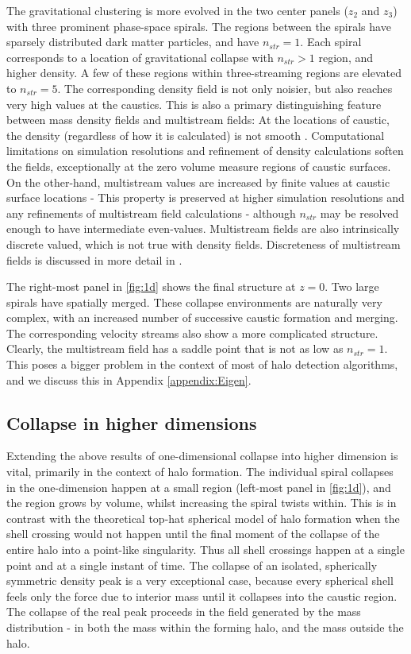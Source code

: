 The gravitational clustering is more evolved in the two center panels ($z_2$ and $z_3$) with three prominent phase-space spirals. The regions between the spirals have sparsely distributed dark matter particles, and have $n_{str} = 1$. Each spiral corresponds to a location of gravitational collapse with $n_{str} > 1$ region, and higher density. A few of these regions within three-streaming regions are elevated to $n_{str} = 5$. The corresponding density field is not only noisier, but also reaches very high values at the caustics. This is also a primary distinguishing feature between mass density fields and multistream fields: At the locations of caustic, the density (regardless of how it is calculated) is not smooth \cite{Vogelsberger2011}. Computational limitations on simulation resolutions and refinement of density calculations soften the fields, exceptionally at the zero volume measure regions of caustic surfaces.  On the other-hand, multistream values are increased by finite values at caustic surface locations - This property is preserved at higher simulation resolutions and any refinements of multistream field calculations - although $n_{str}$ may be resolved enough to have intermediate even-values. Multistream fields are also intrinsically discrete valued, which is not true with density fields. Discreteness of multistream fields is discussed in more detail in \cite{Ramachandra2017}. 

The right-most panel in \autoref{fig:1d} shows the final structure at $z=0$. Two large spirals have spatially merged. These collapse environments are naturally very complex, with an increased number of successive caustic formation and merging. 
The corresponding velocity streams also show a more complicated structure. Clearly, the multistream field has a saddle point that is not as low as $n_{str} = 1$. This poses a bigger problem in the context of most of halo detection algorithms, and we discuss this in Appendix \ref{appendix:Eigen}. 



\subsection{Collapse in higher dimensions}

Extending the above results of one-dimensional collapse into higher dimension is vital, primarily in the context of halo formation. The individual spiral collapses in the one-dimension happen at a small region (left-most panel in \autoref{fig:1d}), and the region grows by volume, whilst increasing the spiral twists within. This is in contrast with the theoretical top-hat spherical model of halo formation when the shell crossing would not happen until the final moment of the collapse of the entire halo into a point-like singularity. Thus all shell crossings happen at a single point
and at a single instant of time. The collapse of an isolated, spherically symmetric density peak is a very exceptional case, because every spherical shell feels only the force due to interior mass until it collapses into the caustic region. The collapse of the real peak proceeds in the field generated by the mass distribution - in both the mass within the forming halo, and the mass outside the halo. 

